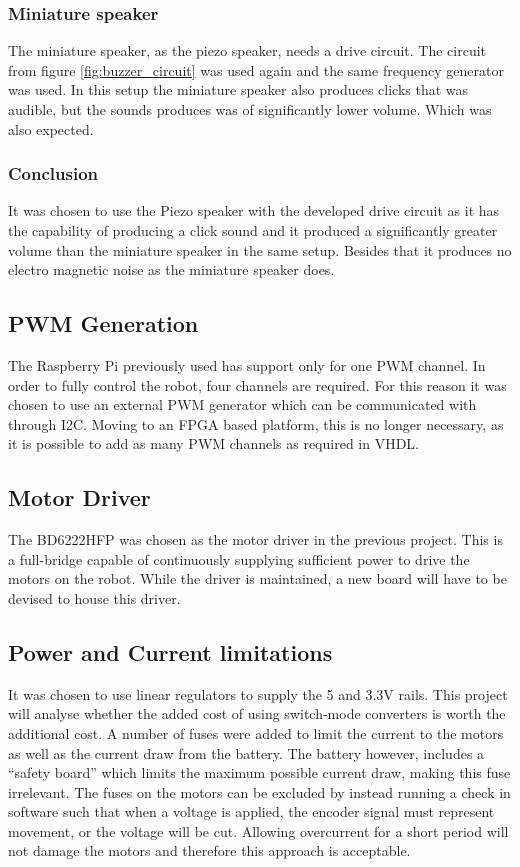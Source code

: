 \subsubsection*{Miniature speaker}
The miniature speaker, as the piezo speaker, needs a drive circuit. 
The circuit from figure \ref{fig:buzzer_circuit} was used again and the same frequency generator was used. 
In this setup the miniature speaker also produces clicks that was audible, but the sounds produces was of significantly lower volume.
Which was also expected.  

\subsubsection*{Conclusion}
It was chosen to use the Piezo speaker with the developed drive circuit as it has the capability of producing a click sound and it produced a significantly greater volume than the miniature speaker in the same setup. 
Besides that it produces no electro magnetic noise as the miniature speaker does. 

\subsection{PWM Generation} %
\label{sub:pwm_generation}
The Raspberry Pi previously used has support only for one PWM channel.
In order to fully control the robot, four channels are required.
For this reason it was chosen to use an external PWM generator which can be communicated with through I2C.
Moving to an FPGA based platform, this is no longer necessary, as it is possible to add as many PWM channels as required in VHDL\@.

\subsection{Motor Driver} %
\label{sub:motor_driver}
The BD6222HFP was chosen as the motor driver in the previous project.
This is a full-bridge capable of continuously supplying sufficient power to drive the motors on the robot.
While the driver is maintained, a new board will have to be devised to house this driver.

\subsection{Power and Current limitations} %
\label{sub:power_and_current_limitations}
It was chosen to use linear regulators to supply the 5 and 3.3V rails.
This project will analyse whether the added cost of using switch-mode converters is worth the additional cost.
A number of fuses were added to limit the current to the motors as well as the current draw from the battery.
The battery however, includes a ``safety board'' which limits the maximum possible current draw, making this fuse irrelevant.
The fuses on the motors can be excluded by instead running a check in software such that when a voltage is applied, the encoder signal must represent movement, or the voltage will be cut.
Allowing overcurrent for a short period will not damage the motors and therefore this approach is acceptable.

